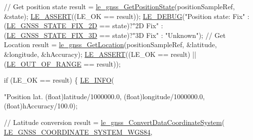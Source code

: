 \begin{DoxyCodeInclude}
{{{{{{{{{{    \textcolor{comment}{// Get position state}
    result = \hyperlink{le__gnss__interface_8h_a0a0df2ffe42b6277f43af0e52e617339}{le\_gnss\_GetPositionState}(positionSampleRef, &state);
    \hyperlink{le__log_8h_ac0dbbef91dc0fed449d0092ff0557b39}{LE\_ASSERT}((LE\_OK == result));
    \hyperlink{le__log_8h_a2a91ea8857cf190fde71d85ba930a498}{LE\_DEBUG}(\textcolor{stringliteral}{"Position state: %
       Fix"}
                                 :(\hyperlink{le__gnss__interface_8h_abcb86aa054abc7a32d2f5a7363387ef1a1325f1c092b36936bb75b5087499b82b}{LE\_GNSS\_STATE\_FIX\_2D} == state)?\textcolor{stringliteral}{"2D Fix"}
                                 :(\hyperlink{le__gnss__interface_8h_abcb86aa054abc7a32d2f5a7363387ef1a6eef37535d6eb582771825a1e0ccbb90}{LE\_GNSS\_STATE\_FIX\_3D} == state)?\textcolor{stringliteral}{"3D Fix"}
                                 : \textcolor{stringliteral}{"Unknown"});
    \textcolor{comment}{// Get Location}
    result = \hyperlink{le__gnss__interface_8h_ada100f53f9ad9f3df852fcc6639c15bc}{le\_gnss\_GetLocation}(positionSampleRef, &latitude, &longitude, &hAccuracy);
    \hyperlink{le__log_8h_ac0dbbef91dc0fed449d0092ff0557b39}{LE\_ASSERT}((LE\_OK == result) || (\hyperlink{le__basics_8h_a1cca095ed6ebab24b57a636382a6c86caef8ecf11fa8556fd2d3ca8faab697717}{LE\_OUT\_OF\_RANGE} == result));

    \textcolor{keywordflow}{if} (LE\_OK == result)
    \{
        \hyperlink{le__log_8h_a23e6d206faa64f612045d688cdde5808}{LE\_INFO}(\textcolor{stringliteral}{"Position lat.%
                (\textcolor{keywordtype}{float})latitude/1000000.0,
                (\textcolor{keywordtype}{float})longitude/1000000.0,
                (\textcolor{keywordtype}{float})hAccuracy/100.0);

        \textcolor{comment}{// Latitude conversion}
        result = \hyperlink{le__gnss__interface_8h_af32fd94e35e4df94b65c84740c5dbf42}{le\_gnss\_ConvertDataCoordinateSystem}(
      \hyperlink{le__gnss__interface_8h_a8d401bb325c46681677bd273433565bea6211648c7f9b9c1e99c533d29033a618}{LE\_GNSS\_COORDINATE\_SYSTEM\_WGS84},
                                                     
}}}}}}}}}}}
\end{DoxyCodeInclude}
